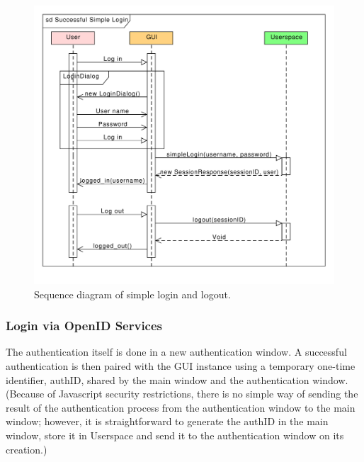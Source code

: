 \begin{figure}[h]
\begin{center}
\includegraphics[scale=0.65]{figures/simple_login_sequence.pdf}
\end{center}
\caption{Sequence diagram of simple login and logout.}\label{gui:sd:simple_login}
\end{figure}

\subsubsection{Login via OpenID Services}
\label{subsubsec:gui_openid}

The authentication itself is done in a new authentication window.
A successful authentication is then paired with the GUI instance using a temporary one-time identifier, authID, shared by the main window and the authentication window.
(Because of Javascript security restrictions, there is no simple way of sending the result of the authentication process from the authentication window to the main window;
however, it is straightforward to generate the authID in the main window, store it in Userspace and send it to the authentication window on its creation.)

